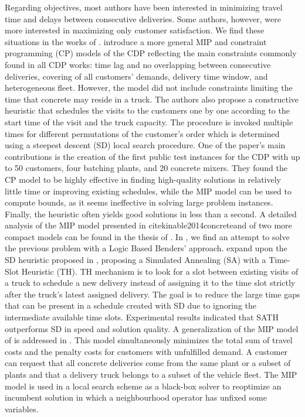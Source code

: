 \documentclass{article}
\begin{document}
{Regarding objectives, most authors have been interested in minimizing travel time and delays between consecutive deliveries. Some authors, however, were more interested in maximizing only customer satisfaction. We find these situations in the works of \cite{durbin2008or, kinable2014concrete, kinable2014logic, sulaman2017simulated}. \cite{kinable2014concrete} introduce a more general MIP and constraint programming (CP) models of the CDP reflecting the main constraints commonly found in all CDP works: time lag and no overlapping between consecutive deliveries, covering of all customers' demands, delivery time window, and heterogeneous fleet. However, the model did not include constraints limiting the time that concrete may reside in a truck. The authors also propose a constructive heuristic that schedules the visits to the customers one by one according to the start time of the visit and the truck capacity. The procedure is invoked multiple times for different permutations of the customer's order which is determined using a steepest descent (SD) local search procedure. One of the paper's main contributions is the creation of the first public test instances for the CDP with up to 50 customers, four batching plants, and 20 concrete mixers.  They found the CP model to be highly effective in finding high-quality solutions in relatively little time or improving existing schedules, while the MIP model can be used to compute bounds, as it seems ineffective in solving large problem instances. Finally, the heuristic often yields good solutions in less than a second. A detailed analysis of the MIP model presented in cite{kinable2014concrete}and of two more compact models can be found in the thesis of \cite{hernandez_lopez_study_2020}. In \cite{kinable2014logic}, we find an attempt to solve the previous problem with a Logic Based Benders' approach. \cite{sulaman2017simulated} expand upon the SD heuristic proposed in \cite{kinable2014concrete}, proposing a Simulated Annealing (SA) with a Time-Slot Heuristic (TH). TH mechanism is to look for a slot between existing visits of a truck to schedule a new delivery instead of assigning it to the time slot strictly after the truck's latest assigned delivery. The goal is to reduce the large time gaps that can be present in a schedule created with SD due to ignoring the intermediate available time slots. Experimental results indicated that SATH outperforms SD in speed and solution quality. A generalization of the MIP model of \cite{kinable2014concrete} is addressed in \cite{asbach2009analysis}. This model simultaneously minimizes the total sum of travel costs and the penalty costs for customers with unfulfilled demand. A customer can request that all concrete deliveries come from the same plant or a subset of plants and that a delivery truck belongs to a subset of the vehicle fleet. The MIP model is used in a local search scheme as a black-box solver to reoptimize an incumbent solution in which a neighbourhood operator has unfixed some variables.  

}
\end{document}
